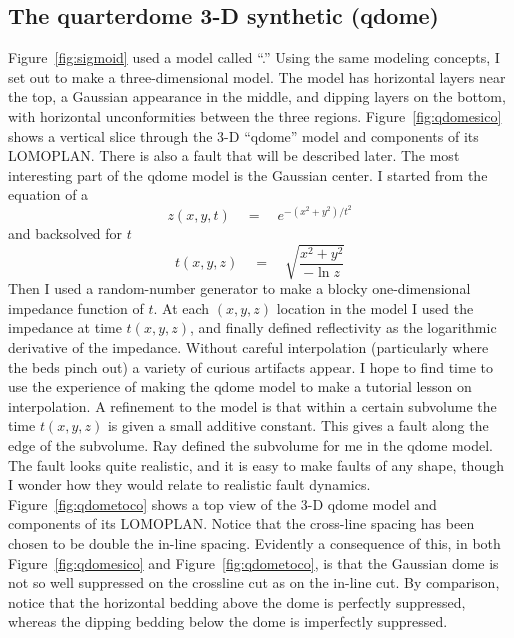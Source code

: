 \subsection{The quarterdome  3-D synthetic (qdome)}
Figure~\ref{fig:sigmoid}
used a model called ``.''
Using the same modeling concepts,
I set out to make a three-dimensional model.
The model has horizontal layers near the top,
a Gaussian appearance in the middle, and dipping layers on the bottom,
with horizontal unconformities between the three regions.
Figure~\ref{fig:qdomesico} shows
a vertical slice through the 3-D ``qdome'' model
and components of its LOMOPLAN.
There is also a fault that will be described later.
The most interesting part of the qdome model is the Gaussian center.
I started from the equation of a 
\begin{equation}
z(x,y,t) \quad = \quad e^{-(x^2+y^2)/ t^2}
\end{equation}
and backsolved for $t$
\begin{equation}
t(x,y,z) \quad = \quad \sqrt{\frac{x^2+y^2 }{ -\ln z}}
\end{equation}
Then I used a random-number generator
to make a blocky one-dimensional impedance function of $t$.
At each $(x,y,z)$ location in the model
I used the impedance at time $t(x,y,z)$,
and finally defined reflectivity as the logarithmic derivative
of the impedance.
Without careful interpolation (particularly where the beds pinch out)
a variety of curious artifacts appear.
I hope to find time to
use the experience of making the qdome model
to make a tutorial lesson on interpolation.
A refinement to the model is that within a certain subvolume
the time $t(x,y,z)$ is given a small additive constant.
This gives a fault along the edge of the subvolume.
Ray  defined the subvolume for me in the qdome model.
The fault looks quite realistic,
and it is easy to make faults of any shape,
though I wonder how they would relate to realistic fault dynamics.
Figure~\ref{fig:qdometoco} shows
        a top view of
        the 3-D qdome model
        and components of its LOMOPLAN.
\noindent
Notice that the cross-line spacing
has been chosen to be double the in-line spacing.
Evidently a consequence of this,
in both
Figure~\ref{fig:qdomesico} and
Figure~\ref{fig:qdometoco}, is that the Gaussian dome is not so well suppressed
on the crossline cut as on the in-line cut.
By comparison, notice that the horizontal bedding above the dome
is perfectly suppressed,
whereas the dipping bedding below the dome is imperfectly suppressed.

